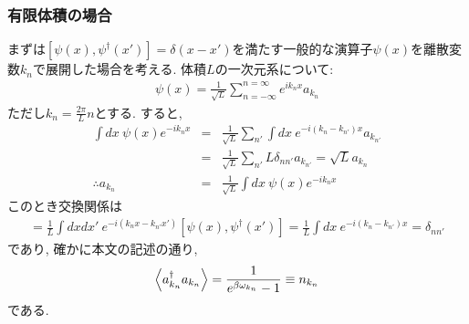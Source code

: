 \documentclass[10.5pt,a4paper]{jreport}
\begin{document}
\subsubsection{有限体積の場合}
まずは$\left[\psi(x), \psi^\dagger(x')\right] = \delta(x - x')$を満たす一般的な演算子$\psi(x)$を離散変数$k_n$で展開した場合を考える. 体積$L$の一次元系について:
\begin{eqnarray}
  \psi(x) = \frac{1}{\sqrt{L}}\sum_{n=-\infty}^{n=\infty}e^{ik_nx}a_{k_n}
\end{eqnarray}
ただし$k_n = \frac{2\pi}{L}n$とする. すると,
\begin{eqnarray}
  \int dx\ \psi(x)e^{-ik_nx} &=& \frac{1}{\sqrt{L}}\sum_{n'}\int dx\ e^{-i(k_n-k_{n'})x}a_{k_{n'}}\\
  &=& \frac{1}{\sqrt{L}}\sum_{n'}L\delta_{nn'}a_{k_{n'}} = \sqrt{L}a_{k_n}\\
  \therefore a_{k_n} &=& \frac{1}{\sqrt{L}}\int dx\ \psi(x)e^{-ik_nx}  
\end{eqnarray}
このとき交換関係は
\begin{eqnarray}
  [a_{k_n}, a^\dagger_{k_{n'}}] = \frac{1}{L}\int dx dx'\ e^{-i(k_nx - k_{n'}x')}\left[\psi(x), \psi^\dagger(x')\right] = \frac{1}{L}\int dx \ e^{-i(k_n - k_{n'})x} = \delta_{nn'}
\end{eqnarray}
であり, 確かに本文の記述の通り,
\begin{eqnarray}
  \expval{a_{k_n}^\dagger a_{k_n}} = \frac{1}{e^{\beta\omega_{k_n}}-1} \equiv n_{k_n}
\end{eqnarray}
である.
\end{document}
